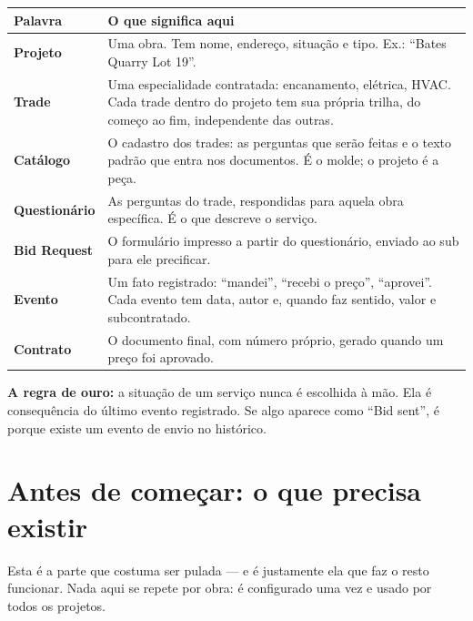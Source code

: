 \documentclass[11pt,a4paper]{article}
\newenvironment{aviso}
  {\par\vspace{0.7em}\noindent
   \begin{lrbox}{\avisobox}\begin{minipage}{\dimexpr\linewidth-2.4em\relax}}
  {\end{minipage}\end{lrbox}%
   \noindent\colorbox{pcglight}{\hspace{0.6em}\usebox{\avisobox}\hspace{0.6em}}%
   \vspace{0.7em}\par}
\begin{document}
\begin{longtable}{@{}p{3.4cm}p{11.4cm}@{}}
\toprule
\textbf{Palavra} & \textbf{O que significa aqui} \\
\midrule
\endhead
\textbf{Projeto} & Uma obra. Tem nome, endereço, situação e tipo. Ex.: ``Bates
Quarry Lot 19''. \\[4pt]

\textbf{Trade} & Uma especialidade contratada: encanamento, elétrica, HVAC. Cada
trade dentro do projeto tem sua própria trilha, do começo ao fim, independente
das outras. \\[4pt]

\textbf{Catálogo} & O cadastro dos trades: as perguntas que serão feitas e o
texto padrão que entra nos documentos. É o molde; o projeto é a peça. \\[4pt]

\textbf{Questionário} & As perguntas do trade, respondidas para aquela obra
específica. É o que descreve o serviço. \\[4pt]

\textbf{Bid Request} & O formulário impresso a partir do questionário, enviado ao
sub para ele precificar. \\[4pt]

\textbf{Evento} & Um fato registrado: ``mandei'', ``recebi o preço'', ``aprovei''.
Cada evento tem data, autor e, quando faz sentido, valor e subcontratado. \\[4pt]

\textbf{Contrato} & O documento final, com número próprio, gerado quando um
preço foi aprovado. \\
\bottomrule
\end{longtable}

\begin{aviso}
\textbf{A regra de ouro:} a situação de um serviço nunca é escolhida à mão. Ela
é consequência do último evento registrado. Se algo aparece como ``Bid sent'',
é porque existe um evento de envio no histórico.
\end{aviso}

\section{Antes de começar: o que precisa existir}

Esta é a parte que costuma ser pulada — e é justamente ela que faz o resto
funcionar. Nada aqui se repete por obra: é configurado uma vez e usado por todos
os projetos.
\end{document}
